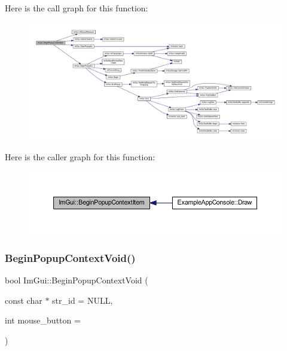 Here is the call graph for this function\+:
\nopagebreak
\begin{figure}[H]
\begin{center}
\leavevmode
\includegraphics[width=350pt]{namespace_im_gui_a579fc507f5b5d164c8fd628aee3d7bbd_cgraph}
\end{center}
\end{figure}
Here is the caller graph for this function\+:
\nopagebreak
\begin{figure}[H]
\begin{center}
\leavevmode
\includegraphics[width=350pt]{namespace_im_gui_a579fc507f5b5d164c8fd628aee3d7bbd_icgraph}
\end{center}
\end{figure}
\mbox{\label{namespace_im_gui_a87a2228929503fff067d2e167a690751}} 
\subsubsection{\texorpdfstring{Begin\+Popup\+Context\+Void()}{BeginPopupContextVoid()}}
{\footnotesize\ttfamily bool Im\+Gui\+::\+Begin\+Popup\+Context\+Void (\begin{DoxyParamCaption}\item[{const char $\ast$}]{str\+\_\+id = {\ttfamily NULL},  }\item[{int}]{mouse\+\_\+button = {} }\end{DoxyParamCaption})}

